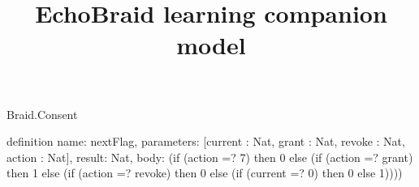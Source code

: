 \begin{lexlean}{Braid.Consent}
\title{EchoBraid learning companion model}
\begin{semanticmodule}
definition{
  name: nextFlag,
  parameters: [current : Nat, grant : Nat, revoke : Nat, action : Nat],
  result: Nat,
  body: (if (action =? 7) then 0 else (if (action =? grant) then 1 else (if (action =? revoke) then 0 else (if (current =? 0) then 0 else 1))))
}
\end{semanticmodule}
\end{lexlean}
